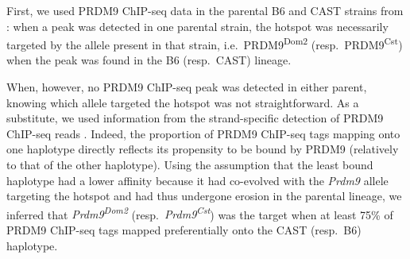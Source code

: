 First, we used PRDM9 ChIP-seq data in the parental B6 and CAST strains from \citet{baker2015prdm9}: 
when a peak was detected in one parental strain, the hotspot was necessarily targeted by the allele present in that strain, i.e.\ PRDM9\textsuperscript{Dom2} (resp.\ PRDM9\textsuperscript{Cst}) when the peak was found in the B6 (resp.\ CAST) lineage.

%

When, however, no PRDM9 ChIP-seq peak was detected in either parent, knowing which allele targeted the hotspot was not straightforward.
As a substitute, we used information from the strand-specific detection of PRDM9 ChIP-seq reads \citep{baker2015prdm9}.
Indeed, the proportion of PRDM9 ChIP-seq tags mapping onto one haplotype directly reflects its propensity to be bound by PRDM9 (relatively to that of the other haplotype).
Using the assumption that the least bound haplotype had a lower affinity because it had co-evolved with the \textit{Prdm9} allele targeting the hotspot and had thus undergone erosion in the parental lineage, we inferred that \textit{Prdm9\textsuperscript{Dom2}} (resp.\ \textit{Prdm9\textsuperscript{Cst}}) was the target when at least 75\% of PRDM9 ChIP-seq tags mapped preferentially onto the CAST (resp.\ B6) haplotype.


